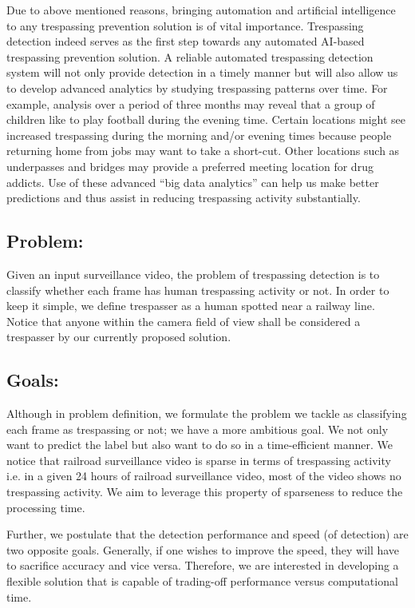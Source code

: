 Due to above mentioned reasons, bringing automation and artificial intelligence to any trespassing prevention solution is of vital importance. Trespassing detection indeed serves as the first step towards any automated AI-based trespassing prevention solution. A reliable automated trespassing detection system will not only provide detection in a timely manner but will also allow us to develop advanced analytics by studying trespassing patterns over time. For example, analysis over a period of three months may reveal that a group of children like to play football during the evening time. Certain locations might see increased trespassing during the morning and/or evening times because people returning home from jobs may want to take a short-cut. Other locations such as underpasses and bridges may provide a preferred meeting location for drug addicts. Use of these advanced ``big data analytics'' can help us make better predictions and thus assist in  reducing trespassing activity substantially.
\subsection{Problem:} Given an input surveillance video, the problem of trespassing detection is to classify whether each frame has human trespassing activity or not. In order to
keep it simple, we define trespasser as a human spotted near a railway line. Notice that anyone within the camera field of view shall be considered a trespasser by our currently proposed solution.
\subsection{Goals:} 
\label{sec:goal}
Although in problem definition, we formulate the problem we tackle as classifying each frame as trespassing or not; we have a more ambitious goal. We not only want to predict the label but also want to do so in a time-efficient manner. We notice that railroad surveillance video is sparse in terms of trespassing activity i.e. in a given 24 hours of railroad surveillance video, most of the video shows no trespassing activity. We aim to leverage this property of sparseness to reduce the processing time. 

Further, we postulate that the detection performance and speed (of detection) are two opposite goals. Generally, if one wishes to improve the speed, they will have to sacrifice accuracy and vice versa. Therefore, we are interested in developing a  flexible solution that is capable of trading-off performance versus computational time.